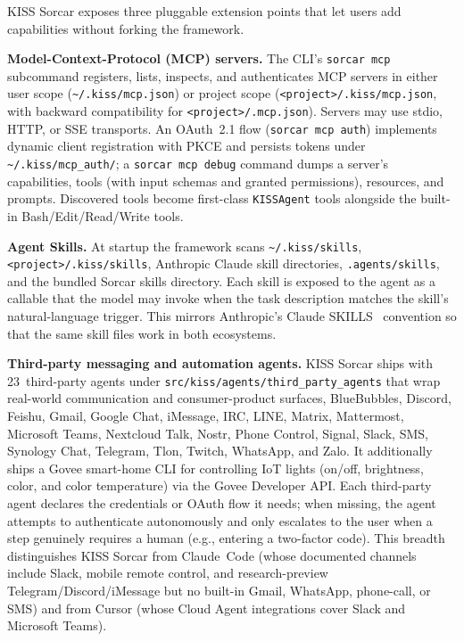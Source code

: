\documentclass{article}
\begin{document}
KISS Sorcar exposes three pluggable extension points that let users add capabilities without forking the framework.

\textbf{Model-Context-Protocol (MCP) servers.}  The CLI's \texttt{sorcar mcp} subcommand registers, lists, inspects, and authenticates MCP servers in either user scope (\texttt{\textasciitilde/.kiss/mcp.json}) or project scope (\texttt{<project>/.kiss/mcp.json}, with backward compatibility for \texttt{<project>/.mcp.json}).  Servers may use stdio, HTTP, or SSE transports.  An OAuth~2.1 flow (\texttt{sorcar mcp auth}) implements dynamic client registration with PKCE and persists tokens under \texttt{\textasciitilde/.kiss/mcp\_auth/}; a \texttt{sorcar mcp debug} command dumps a server's capabilities, tools (with input schemas and granted permissions), resources, and prompts.  Discovered tools become first-class \texttt{KISSAgent} tools alongside the built-in Bash/Edit/Read/Write tools.

\textbf{Agent Skills.}  At startup the framework scans \texttt{\textasciitilde/.kiss/skills}, \texttt{<project>/.kiss/skills}, Anthropic Claude skill directories, \texttt{.agents/skills}, and the bundled Sorcar skills directory.  Each skill is exposed to the agent as a callable that the model may invoke when the task description matches the skill's natural-language trigger.  This mirrors Anthropic's Claude SKILLS~\citep{claudecode2025} convention so that the same skill files work in both ecosystems.

\textbf{Third-party messaging and automation agents.}  KISS Sorcar ships with 23~third-party agents under \texttt{src/kiss/agents/third\_party\_agents} that wrap real-world communication and consumer-product surfaces, BlueBubbles, Discord, Feishu, Gmail, Google Chat, iMessage, IRC, LINE, Matrix, Mattermost, Microsoft Teams, Nextcloud Talk, Nostr, Phone Control, Signal, Slack, SMS, Synology Chat, Telegram, Tlon, Twitch, WhatsApp, and Zalo.  It additionally ships a Govee smart-home CLI for controlling IoT lights (on/off, brightness, color, and color temperature) via the Govee Developer API.  Each third-party agent declares the credentials or OAuth flow it needs; when missing, the agent attempts to authenticate autonomously and only escalates to the user when a step genuinely requires a human (e.g., entering a two-factor code).  This breadth distinguishes KISS Sorcar from Claude~Code (whose documented channels include Slack, mobile remote control, and research-preview Telegram/Discord/iMessage but no built-in Gmail, WhatsApp, phone-call, or SMS) and from Cursor (whose Cloud Agent integrations cover Slack and Microsoft Teams).
\end{document}
